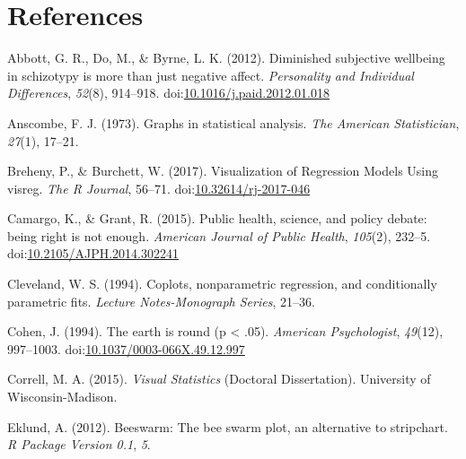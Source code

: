 \documentclass[
  man]{apa6}
\newlength{\cslhangindent}
\newenvironment{cslreferences}%
  {\setlength{\parindent}{0pt}%
  \everypar{\setlength{\hangindent}{\cslhangindent}}\ignorespaces}%
  {\par}
\begin{document}
\newpage

\hypertarget{references}{%
\section{References}\label{references}}

\begingroup
\setlength{\parindent}{-0.5in}
\setlength{\leftskip}{0.5in}

\hypertarget{refs}{}
\begin{cslreferences}
\leavevmode\hypertarget{ref-Abbott2012}{}%
Abbott, G. R., Do, M., \& Byrne, L. K. (2012). Diminished subjective wellbeing in schizotypy is more than just negative affect. \emph{Personality and Individual Differences}, \emph{52}(8), 914--918. doi:\href{https://doi.org/10.1016/j.paid.2012.01.018}{10.1016/j.paid.2012.01.018}

\leavevmode\hypertarget{ref-anscombe1973graphs}{}%
Anscombe, F. J. (1973). Graphs in statistical analysis. \emph{The American Statistician}, \emph{27}(1), 17--21.

\leavevmode\hypertarget{ref-Breheny}{}%
Breheny, P., \& Burchett, W. (2017). Visualization of Regression Models Using visreg. \emph{The R Journal}, 56--71. doi:\href{https://doi.org/10.32614/rj-2017-046}{10.32614/rj-2017-046}

\leavevmode\hypertarget{ref-Camargo2015}{}%
Camargo, K., \& Grant, R. (2015). Public health, science, and policy debate: being right is not enough. \emph{American Journal of Public Health}, \emph{105}(2), 232--5. doi:\href{https://doi.org/10.2105/AJPH.2014.302241}{10.2105/AJPH.2014.302241}

\leavevmode\hypertarget{ref-Cleveland1994}{}%
Cleveland, W. S. (1994). Coplots, nonparametric regression, and conditionally parametric fits. \emph{Lecture Notes-Monograph Series}, 21--36.

\leavevmode\hypertarget{ref-cohen_earth_1994}{}%
Cohen, J. (1994). The earth is round (p \textless{} .05). \emph{American Psychologist}, \emph{49}(12), 997--1003. doi:\href{https://doi.org/10.1037/0003-066X.49.12.997}{10.1037/0003-066X.49.12.997}

\leavevmode\hypertarget{ref-Correll2015}{}%
Correll, M. A. (2015). \emph{Visual Statistics} (Doctoral Dissertation). University of Wisconsin-Madison.

\leavevmode\hypertarget{ref-eklund2012beeswarm}{}%
Eklund, A. (2012). Beeswarm: The bee swarm plot, an alternative to stripchart. \emph{R Package Version 0.1}, \emph{5}.


\end{cslreferences}
\end{document}
